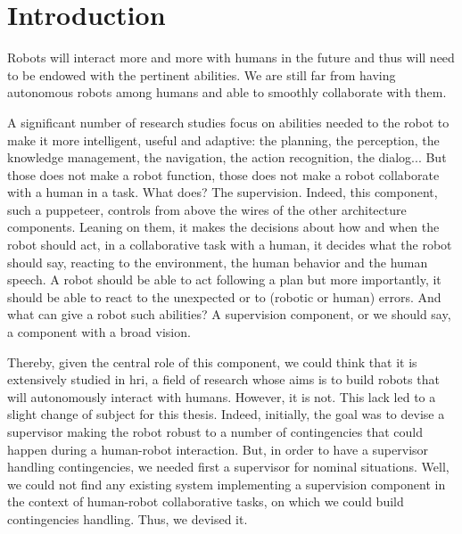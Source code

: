 \documentclass[a4paper,11pt,twoside]{StyleThese}
\begin{document}
\fi


\chapter*{Introduction}

Robots will interact more and more with humans in the future and thus will need to be endowed with the pertinent abilities. We are still far from having autonomous robots among humans and able to smoothly collaborate with them.

A significant number of research studies focus on abilities needed to the robot to make it more intelligent, useful and adaptive: the planning, the perception, the knowledge management, the navigation, the action recognition, the dialog... But those does not make a robot function, those does not make a robot collaborate with a human in a task. What does? The supervision. Indeed, this component, such a puppeteer, controls from above the wires of the other architecture components. Leaning on them, it makes the decisions about how and when the robot should act, in a collaborative task with a human, it decides what the robot should say, reacting to the environment, the human behavior and the human speech. A robot should be able to act following a plan but more importantly, it should be able to react to the unexpected or to (robotic or human) errors. And what can give a robot such abilities? A supervision component, or we should say, a component with a broad vision.

Thereby, given the central role of this component, we could think that it is extensively studied in \acrlong{hri}, a field of research whose aims is to build robots that will autonomously interact with humans. However, it is not. This lack led to a slight change of subject for this thesis. Indeed, initially, the goal was to devise a supervisor making the robot robust to a number of contingencies that could happen during a human-robot interaction. But, in order to have a supervisor handling contingencies, we needed first a supervisor for nominal situations. Well, we could not find any existing system implementing a supervision component in the context of human-robot collaborative tasks, on which we could build contingencies handling. Thus, we devised it.
\end{document}

